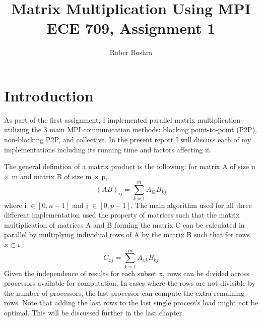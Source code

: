 \documentclass[12pt]{report}
\author{Rober Boshra}
\title{Matrix Multiplication Using MPI\\ECE 709, Assignment 1}
\begin{document}
 

\maketitle
\tableofcontents

\chapter{Introduction}
As part of the first assignment, I implemented parallel matrix multiplication utilizing the 3 main MPI communication methods: blocking point-to-point (P2P), non-blocking P2P, and collective. In the present report I will discuss each of my implementations including its running time and factors affecting it.

The general definition of a matrix product is the following: for matrix A of size n $\times$ m and matrix B of size m $\times$ p, 
\begin{equation}
(AB)_{ij}=\sum\limits_{k=1}^m A_{ik}B_{kj}
\end{equation}
where i $\in [0,n-1]$  and j $\in [0,p-1]$. The main algorithm used for all three different implementation used the property of matrices such that the matrix multiplication of matrices A and B forming the matrix C can be calculated in parallel by multiplying individual rows of A by the matrix B such that for rows $x \subset i$,
\begin{equation}
C_{xj} = \sum\limits_{k=1}^m A_{xk} B_{kj}
\end{equation}
Given the independence of results for each subset x, rows can be divided across processors available for computation. In cases where the rows are not divisible by the number of processors, the last processor can compute the extra remaining rows. Note that adding the last rows to the last single process's load might not be optimal. This will be discussed further in the last chapter. 
\end{document}
